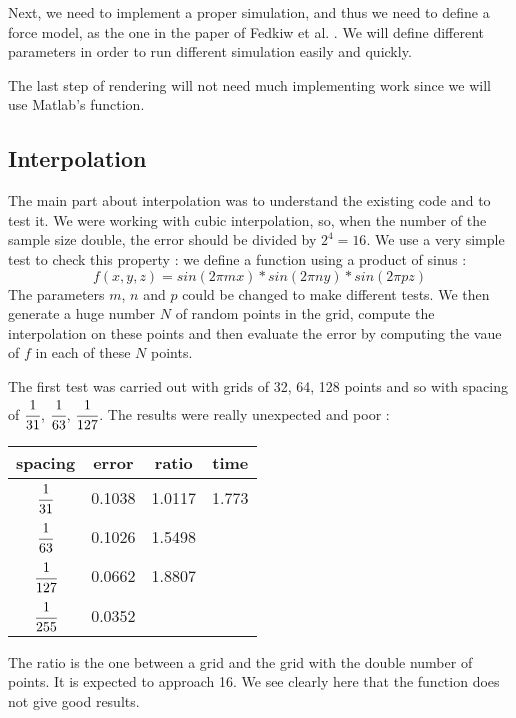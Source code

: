 \documentclass[accepted,single]{gipaper}
\begin{document}
Next, we need to implement a proper simulation, and thus we need to define a force model, as the one in the paper of Fedkiw et al. \cite{Fedkiw:2001}. We will define different parameters in order to run different simulation easily and quickly.

The last step of rendering will not need much implementing work since we will use Matlab's function.


\subsection{Interpolation}


The main part about interpolation was to understand the existing code and to test it. We were working with cubic interpolation, so, when the number of the sample size double, the error should be divided by $2^4 = 16$.
We use a very simple test to check this property : we define a function using a product of sinus : $$f(x,y,z) = sin(2\pi m x) * sin(2\pi n y) * sin(2\pi p z)$$
The parameters $m$, $n$ and $p$ could be changed to make different tests.
We then generate a huge number $N$ of random points in the grid, compute the interpolation on these points and then evaluate the error by computing the vaue of $f$ in each of these $N$ points.

The first test was carried out with grids of 32, 64, 128 points and so with spacing of $\cfrac{1}{31}$, $\cfrac{1}{63}$, $\cfrac{1}{127}$. The results were really unexpected and poor :
\begin{center}
\begin{tabular}{|c|c|c|c|}
  \hline
  spacing & error & ratio & time \\
  \hline
  $\cfrac{1}{31}$ & 0.1038 & 1.0117 &1.773\\[0.2cm] 
  $\cfrac{1}{63}$ & 0.1026 & 1.5498 &\\[0.2cm]
  $\cfrac{1}{127}$ & 0.0662 & 1.8807 &\\[0.2cm]
  $\cfrac{1}{255}$ & 0.0352 &  &\\[0.2cm]
  \hline
\end{tabular}
\end{center}
The ratio is the one between a grid and the grid with the double number of points. It is expected to approach 16. We see clearly here that the function does not give good results. 
\end{document}
